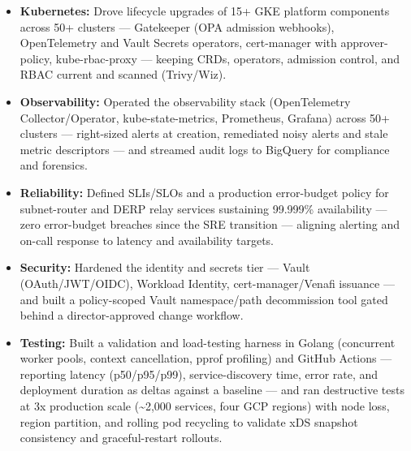 \documentclass[11pt]{article}       %
\begin{document}
\begin{description}
\begin{itemize}
  \item \textbf{Kubernetes:} Drove lifecycle upgrades of 15+ GKE platform components across 50+ clusters — Gatekeeper (OPA admission webhooks), OpenTelemetry and Vault Secrets operators, cert-manager with approver-policy, kube-rbac-proxy — keeping CRDs, operators, admission control, and RBAC current and scanned (Trivy/Wiz).
  \item \textbf{Observability:} Operated the observability stack (OpenTelemetry Collector/Operator, kube-state-metrics, Prometheus, Grafana) across 50+ clusters — right-sized alerts at creation, remediated noisy alerts and stale metric descriptors — and streamed audit logs to BigQuery for compliance and forensics.
  \item \textbf{Reliability:} Defined SLIs/SLOs and a production error-budget policy for subnet-router and DERP relay services sustaining 99.999\% availability — zero error-budget breaches since the SRE transition — aligning alerting and on-call response to latency and availability targets.
  \item \textbf{Security:} Hardened the identity and secrets tier — Vault (OAuth/JWT/OIDC), Workload Identity, cert-manager/Venafi issuance — and built a policy-scoped Vault namespace/path decommission tool gated behind a director-approved change workflow.
  \item \textbf{Testing:} Built a validation and load-testing harness in Golang (concurrent worker pools, context cancellation, pprof profiling) and GitHub Actions — reporting latency (p50/p95/p99), service-discovery time, error rate, and deployment duration as deltas against a baseline — and ran destructive tests at 3x production scale (\textasciitilde{}2,000 services, four GCP regions) with node loss, region partition, and rolling pod recycling to validate xDS snapshot consistency and graceful-restart rollouts.
\end{itemize}
\end{description}
\end{document}
